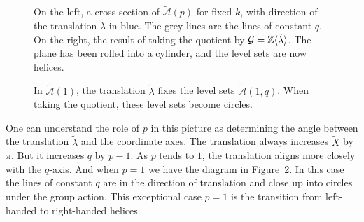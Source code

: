 \documentclass{article}
\begin{document}
\begin{figure}
\begin{tikzpicture}
        \end{tikzpicture}
    
    \caption{On the left, a cross-section of $\mathcal{\tilde{A}}(p)$ for fixed $k$, with direction of the translation $\tilde{\lambda}$ in blue. The grey lines are the lines of constant $q$.\\
    On the right, the result of taking the quotient by $\mathcal{G} = \Z\langle \tilde{\lambda}\rangle$. The plane has been rolled into a cylinder, and the level sets are now helices.}
    \label{fig:level set quotient}
\end{figure}

\begin{figure}
    
    \caption{In $\mathcal{\tilde{A}}(1)$, the translation $\tilde{\lambda}$ fixes the level sets $\mathcal{\tilde{A}}(1,q)$. When taking the quotient, these level sets become circles.}
    \label{fig:level set quotient p1}
\end{figure}

One can understand the role of $p$ in this picture as determining the angle between the translation $\tilde{\lambda}$ and the coordinate axes. The translation always increases $\tilde{X}$ by $\pi$. But it increases $q$ by $p-1$. As $p$ tends to $1$, the translation aligns more closely with the $q$-axis. And when $p=1$ we have the diagram in Figure~\ref{fig:level set quotient p1}. In this case the lines of constant $q$ are in the direction of translation and close up into circles under the group action. This exceptional case $p=1$ is the transition from left-handed to right-handed helices.
\end{document}
